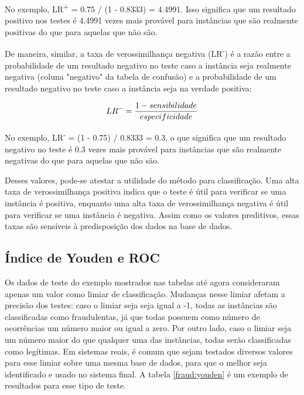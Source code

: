 No exemplo, LR\textsuperscript{+} = 0.75 / (1 - 0.8333) = 4.4991. Isso significa que um resultado positivo nos testes é 4.4991 vezes mais provável para instâncias que são realmente positivas do que para aquelas que não são.

De maneira, similar, a taxa de verossimilhança negativa (LR\textsuperscript{-}) é a razão entre a probabilidade de um resultado negativo no teste caso a instância seja realmente negativa (coluna "negativo" da tabela de confusão) e a probabilidade de um resultado negativo no teste caso a instância seja na verdade positiva:

\begin{equation}
    \vspace{2mm}
    LR^{-}=\frac{1 - sensibilidade}{especificidade}
    \vspace{2mm}
\end{equation}

No exemplo, LR\textsuperscript{-} = (1 - 0.75) / 0.8333 = 0.3, o que significa que um resultado negativo no teste é 0.3 vezes mais provável para instâncias que são realmente negativas do que para aquelas que não são.

Desses valores, pode-se atestar a utilidade do método para classificação. Uma alta taxa de verossimilhança positiva indica que o teste é útil para verificar se uma instância é positiva, enquanto uma alta taxa de verossimilhança negativa é útil para verificar se uma instância é negativa. Assim como os valores preditivos, essas taxas são sensíveis à predisposição dos dados na base de dados.

\subsection{Índice de Youden e ROC}

Os dados de teste do exemplo mostrados nas tabelas até agora consideraram apenas um valor como limiar de classificação. Mudanças nesse limiar afetam a precisão dos testes: caso o limiar seja seja igual a -1, todas as instâncias são classificadas como fraudulentas, já que todas possuem como número de ocorrências um número maior ou igual a zero. Por outro lado, caso o limiar seja um número maior do que qualquer uma das instâncias, todas serão classificadas como legítimas. Em sistemas reais, é comum que sejam testados diversos valores para esse limiar sobre uma mesma base de dados, para que o melhor seja identificado e usado no sistema final. A tabela \ref{fraud:youden} é um exemplo de resultados para esse tipo de teste.

